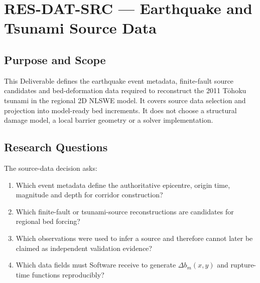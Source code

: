 
\section{RES-DAT-SRC --- Earthquake and Tsunami Source Data}
\label{sec:res-dat-src}

\subsection{Purpose and Scope}
\label{sec:res-dat-src-purpose}

This Deliverable defines the earthquake event metadata, finite-fault
source candidates and bed-deformation data required to reconstruct the
2011 Tōhoku tsunami in the regional 2D NLSWE model. It covers source
data selection and projection into model-ready bed increments. It does
not choose a structural damage model, a local barrier geometry or a
solver implementation.

\subsection{Research Questions}
\label{sec:res-dat-src-research-questions}

The source-data decision asks:

\begin{enumerate}
  \item Which event metadata define the authoritative epicentre,
    origin time, magnitude and depth for corridor construction?
  \item Which finite-fault or tsunami-source reconstructions are
    candidates for regional bed forcing?
  \item Which observations were used to infer a source and therefore
    cannot later be claimed as independent validation evidence?
  \item Which data fields must Software receive to generate
    $\Delta b_m(x,y)$ and rupture-time functions reproducibly?
\end{enumerate}

